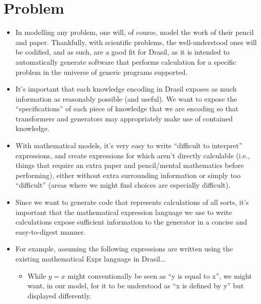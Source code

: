 
\section{Problem}

\begin{itemize}

	\item In modelling any problem, one will, of course, model the work of their
		  pencil and paper. Thankfully, with scientific problems, the
		  well-understood ones will be codified\cite{well-understood}, and as
		  such, are a good fit for Drasil, as it is intended to automatically
		  generate software that performs calculation for a specific problem in
		  the universe of generic programs supported.

	\item It's important that each knowledge encoding in Drasil exposes as much
	      information as reasonably possible (and useful).  We want to expose the ``specifications'' of each piece
	      of knowledge that we are encoding so that transformers and generators
	      may appropriately make use of contained knowledge.

	\item With mathematical models, it's very easy to write ``difficult to
	      interpret'' expressions, and create expressions for which aren't
	      directly calculable (i.e., things that require an extra paper and
	      pencil/mental mathematics before performing), either without
	      extra surrounding information or simply too ``difficult'' (areas
	      where we might find choices are especially difficult).

	\item Since we want to generate code that represents calculations of all
	      sorts, it's important that the mathematical expression language we
	      use to write calculations expose sufficient information to the
	      generator in a concise and easy-to-digest manner.

	\item For example, assuming the following expressions are written using
	      the existing mathematical Expr language in Drasil...
	      \begin{itemize}

		      \item While \(y = x\) might conventionally be seen as ``y is
		            equal to x'', we might want, in our model, for it to be
		            understood as ``x is defined by y'' but displayed differently.


\end{itemize}
\end{itemize}
